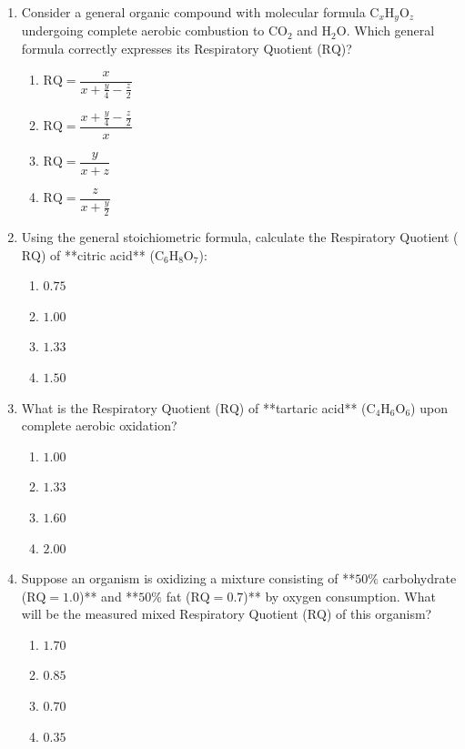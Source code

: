 \documentclass[11pt, a4paper]{article}
\begin{document}
\begin{enumerate}[label=\textbf{\arabic*.}]
\item Consider a general organic compound with molecular formula $\text{C}_x\text{H}_y\text{O}_z$ undergoing complete aerobic combustion to $\text{CO}_2$ and $\text{H}_2\text{O}$. Which general formula correctly expresses its Respiratory Quotient ($\text{RQ}$)?
\begin{enumerate}[label=(\Alph*)]
    \item $\text{RQ} = \dfrac{x}{x + \frac{y}{4} - \frac{z}{2}}$
    \item $\text{RQ} = \dfrac{x + \frac{y}{4} - \frac{z}{2}}{x}$
    \item $\text{RQ} = \dfrac{y}{x + z}$
    \item $\text{RQ} = \dfrac{z}{x + \frac{y}{2}}$
\end{enumerate}

\item Using the general stoichiometric formula, calculate the Respiratory Quotient ($\text{RQ}$) of **citric acid** ($\text{C}_6\text{H}_8\text{O}_7$):
\begin{enumerate}[label=(\Alph*)]
    \item $0.75$
    \item $1.00$
    \item $1.33$
    \item $1.50$
\end{enumerate}

\item What is the Respiratory Quotient ($\text{RQ}$) of **tartaric acid** ($\text{C}_4\text{H}_6\text{O}_6$) upon complete aerobic oxidation?
\begin{enumerate}[label=(\Alph*)]
    \item $1.00$
    \item $1.33$
    \item $1.60$
    \item $2.00$
\end{enumerate}

\item Suppose an organism is oxidizing a mixture consisting of **$50\%$ carbohydrate ($\text{RQ} = 1.0$)** and **$50\%$ fat ($\text{RQ} = 0.7$)** by oxygen consumption. What will be the measured mixed Respiratory Quotient ($\text{RQ}$) of this organism?
\begin{enumerate}[label=(\Alph*)]
    \item $1.70$
    \item $0.85$
    \item $0.70$
    \item $0.35$
\end{enumerate}


\end{enumerate}
\end{document}
